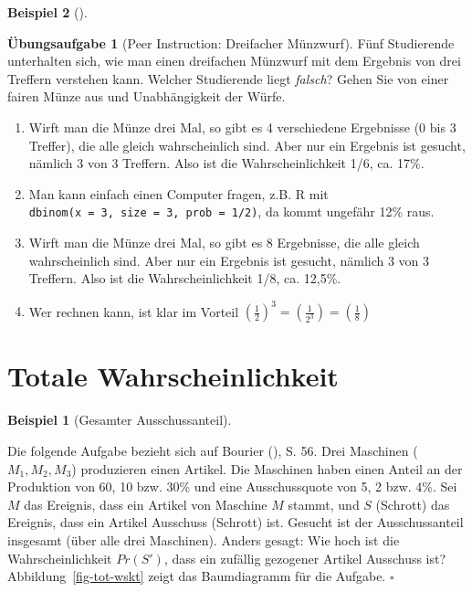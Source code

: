 \documentclass[
  ngerman,
  letterpaper,
  twoside,
  open=any]{scrbook}
\providecommand{\tightlist}{%
  \setlength{\itemsep}{0pt}\setlength{\parskip}{0pt}}\usepackage{longtable,booktabs,array}
\theoremstyle{definition}
\newtheorem{example}{Beispiel}[chapter]
\theoremstyle{plain}
\theoremstyle{definition}
\newtheorem{exercise}{Übungsaufgabe}[chapter]
\theoremstyle{definition}
\theoremstyle{remark}
\begin{document}
\begin{example}[]
\begin{exercise}[Peer Instruction: Dreifacher
Münzwurf]
Fünf Studierende unterhalten sich, wie man einen dreifachen Münzwurf mit
dem Ergebnis von drei Treffern verstehen kann. Welcher Studierende liegt
\emph{falsch}? Gehen Sie von einer fairen Münze aus und Unabhängigkeit
der Würfe.

\begin{enumerate}
\def\labelenumi{\Alph{enumi})}
\tightlist
\item
  Wirft man die Münze drei Mal, so gibt es 4 verschiedene Ergebnisse (0
  bis 3 Treffer), die alle gleich wahrscheinlich sind. Aber nur ein
  Ergebnis ist gesucht, nämlich 3 von 3 Treffern. Also ist die
  Wahrscheinlichkeit 1/6, ca. 17\%.
\item
  Man kann einfach einen Computer fragen, z.B. R mit
  \texttt{dbinom(x\ =\ 3,\ size\ =\ 3,\ prob\ =\ 1/2)}, da kommt
  ungefähr 12\% raus.
\item
  Wirft man die Münze drei Mal, so gibt es 8 Ergebnisse, die alle gleich
  wahrscheinlich sind. Aber nur ein Ergebnis ist gesucht, nämlich 3 von
  3 Treffern. Also ist die Wahrscheinlichkeit 1/8, ca. 12,5\%.
\item
  Wer rechnen kann, ist klar im Vorteil
  \(\left( \frac{1}{2} \right)^3 = \left( \frac{1}{2^3} \right) = \left( \frac{1}{8} \right)\)
\end{enumerate}

\end{exercise}

\section{Totale Wahrscheinlichkeit}\label{totale-wahrscheinlichkeit}

\begin{example}[Gesamter
Ausschussanteil]\protect\hypertarget{exm-bourier-s56}{}\label{exm-bourier-s56}

Die folgende Aufgabe bezieht sich auf Bourier
(), S. 56. Drei Maschinen
(\(M_1, M_2, M_3\)) produzieren einen Artikel. Die Maschinen haben einen
Anteil an der Produktion von 60, 10 bzw. 30\% und eine Ausschussquote
von 5, 2 bzw. 4\%. Sei \(M\) das Ereignis, dass ein Artikel von Maschine
\(M\) stammt, und \(S\) (Schrott) das Ereignis, dass ein Artikel
Ausschuss (Schrott) ist. Gesucht ist der Ausschussanteil insgesamt (über
alle drei Maschinen). Anders gesagt: Wie hoch ist die Wahrscheinlichkeit
\(Pr(S')\), dass ein zufällig gezogener Artikel Ausschuss ist?
Abbildung~\ref{fig-tot-wskt} zeigt das Baumdiagramm für die Aufgabe.
\(\square\)


\end{example}
\end{example}
\end{document}
